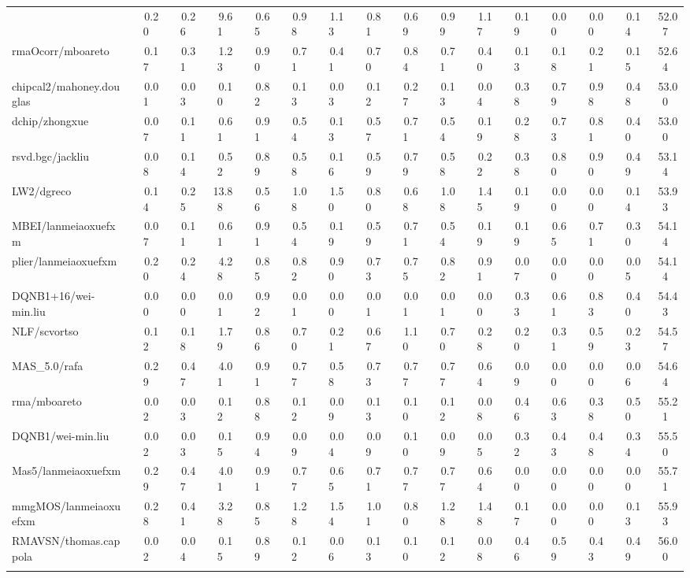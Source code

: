 \begin{table}[hptb]
\begin{center}
\begin{tabular}{|l||c|c|c|c|c|c|c|c|c|c|c|c|c|c|c|}
{dChipwMM/rafa&~~0.20&~~0.26&~~9.61&~~0.65&~~0.98&~~1.13&~~0.81&~~0.69&~~0.99&~~1.17&~~0.19&~~0.00&~~0.00&~~0.14&~52.07\\ 
rmaOcorr/mboareto&~~0.17&~~0.31&~~1.23&~~0.90&~~0.71&~~0.41&~~0.70&~~0.84&~~0.71&~~0.40&~~0.13&~~0.18&~~0.21&~~0.15&~52.64\\ 
chipcal2/mahoney.douglas&~~0.01&~~0.03&~~0.10&~~0.82&~~0.13&~~0.03&~~0.12&~~0.27&~~0.13&~~0.04&~~0.38&~~0.79&~~0.98&~~0.48&~53.00\\ 
dchip/zhongxue&~~0.07&~~0.11&~~0.61&~~0.91&~~0.54&~~0.13&~~0.57&~~0.71&~~0.54&~~0.19&~~0.28&~~0.73&~~0.81&~~0.40&~53.00\\ 
rsvd.bgc/jackliu&~~0.08&~~0.14&~~0.52&~~0.89&~~0.58&~~0.16&~~0.59&~~0.79&~~0.58&~~0.22&~~0.38&~~0.80&~~0.90&~~0.49&~53.14\\ 
LW2/dgreco&~~0.14&~~0.25&~13.88&~~0.56&~~1.08&~~1.50&~~0.80&~~0.68&~~1.08&~~1.45&~~0.19&~~0.00&~~0.00&~~0.14&~53.93\\ 
MBEI/lanmeiaoxuefxm&~~0.07&~~0.11&~~0.61&~~0.91&~~0.54&~~0.19&~~0.59&~~0.71&~~0.54&~~0.19&~~0.19&~~0.65&~~0.71&~~0.30&~54.14\\ 
plier/lanmeiaoxuefxm&~~0.20&~~0.24&~~4.28&~~0.85&~~0.82&~~0.90&~~0.73&~~0.75&~~0.82&~~0.91&~~0.07&~~0.00&~~0.00&~~0.05&~54.14\\ 
DQNB1+16/wei-min.liu&~~0.00&~~0.00&~~0.01&~~0.92&~~0.01&~~0.00&~~0.01&~~0.01&~~0.01&~~0.00&~~0.33&~~0.61&~~0.83&~~0.40&~54.43\\ 
NLF/scvortso&~~0.12&~~0.18&~~1.79&~~0.86&~~0.70&~~0.21&~~0.67&~~1.10&~~0.70&~~0.28&~~0.20&~~0.31&~~0.59&~~0.23&~54.57\\ 
MAS_5.0/rafa&~~0.29&~~0.47&~~4.01&~~0.91&~~0.77&~~0.58&~~0.73&~~0.77&~~0.77&~~0.64&~~0.09&~~0.00&~~0.00&~~0.06&~54.64\\ 
rma/mboareto&~~0.02&~~0.03&~~0.12&~~0.88&~~0.12&~~0.09&~~0.13&~~0.10&~~0.12&~~0.08&~~0.46&~~0.63&~~0.38&~~0.50&~55.21\\ 
DQNB1/wei-min.liu&~~0.02&~~0.03&~~0.15&~~0.94&~~0.09&~~0.04&~~0.09&~~0.10&~~0.09&~~0.05&~~0.32&~~0.43&~~0.48&~~0.34&~55.50\\ 
Mas5/lanmeiaoxuefxm&~~0.29&~~0.47&~~4.01&~~0.91&~~0.77&~~0.65&~~0.71&~~0.77&~~0.77&~~0.64&~~0.00&~~0.00&~~0.00&~~0.00&~55.71\\ 
mmgMOS/lanmeiaoxuefxm&~~0.28&~~0.41&~~3.28&~~0.85&~~1.28&~~1.54&~~1.01&~~0.80&~~1.28&~~1.48&~~0.17&~~0.00&~~0.00&~~0.13&~55.93\\ 
RMAVSN/thomas.cappola&~~0.02&~~0.04&~~0.15&~~0.89&~~0.12&~~0.06&~~0.13&~~0.10&~~0.12&~~0.08&~~0.46&~~0.59&~~0.43&~~0.49&~56.00\\ 
}
\end{tabular}
\end{center}
\end{table}
